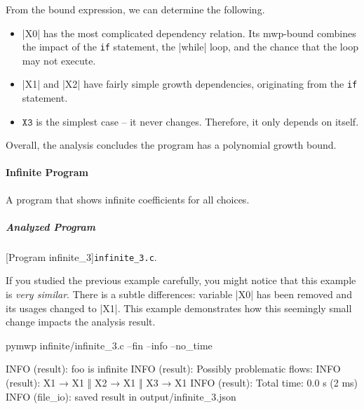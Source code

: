 From the bound expression, we can determine the following.

\begin{itemize}
\item \pr|X0| has the most complicated dependency relation.
Its mwp-bound combines the impact of the \texttt{if} statement, the \pr|while| loop, and the chance that the loop may not execute.

\item \pr|X1| and \pr|X2| have fairly simple growth dependencies, originating from the \texttt{if} statement.

\item \(\texttt{X3}\) is the simplest case -- it never changes.
Therefore, it only depends on itself.
\end{itemize}

Overall, the analysis concludes the program has a polynomial growth bound.

\paragraph{Infinite Program}\label{inf-prog}
A program that shows infinite coefficients for all choices.

\subparagraph*{Analyzed Program}

\begin{center}
\begin{minipage}{\textwidth}
\captionsetup{type=lstlisting}
[Program infinite\_3]{\texttt{infinite\_3.c}.}
\label{lst:inifnite3}
\end{minipage}
\end{center}

If you studied the previous example carefully, you might notice that this example is \emph{very similar}.
There is a subtle differences: variable \pr|X0| has been removed and its usages changed to \pr|X1|.
This example demonstrates how this seemingly small change impacts the analysis result.

\begin{center}
\begin{minipage}{\textwidth}
\begin{cmdlisting}[label={lst:ex4-run-cmd}]
pymwp infinite/infinite_3.c --fin --info --no_time
\end{cmdlisting}
\end{minipage}
\end{center}

\begin{center}
\begin{minipage}{\textwidth}
\begin{outlisting}[label={lst:ex4-output}]
INFO (result): foo is infinite
INFO (result): Possibly problematic flows:
INFO (result): X1 → X1 ‖ X2 → X1 ‖ X3 → X1
INFO (result): Total time: 0.0 s (2 ms)
INFO (file_io): saved result in output/infinite_3.json
\end{outlisting}
\end{minipage}
\end{center}

